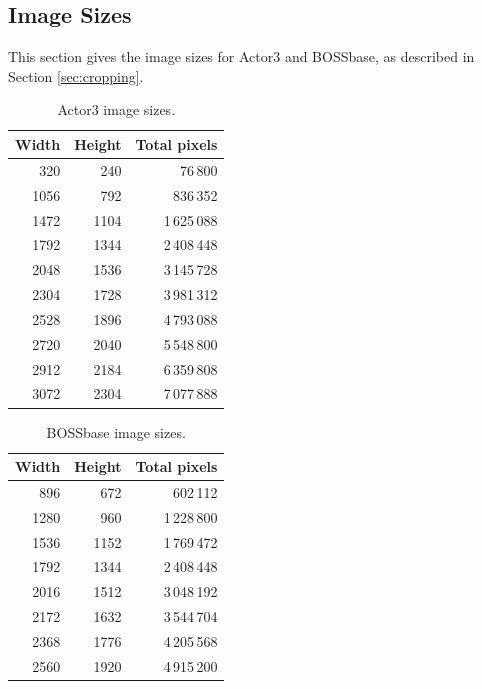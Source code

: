 \documentclass[11pt,a4paper,twoside,openright]{report}
\begin{document}
\begin{appendices}

\chapter{}

\section{Image Sizes} \label{appendix:image-sizes}

This section gives the image sizes for Actor3 and BOSSbase, as described in Section \ref{sec:cropping}.

\begin{table}[htbp]
    \begin{center}
        \begin{tabular}{ | r  r | r | }
        \hline
        Width & Height & Total pixels \\ \hline
        320 & 240 & 76\,800 \\
        1056 & 792 & 836\,352 \\
        1472 & 1104 & 1\,625\,088 \\
        1792 & 1344 & 2\,408\,448 \\
        2048 & 1536 & 3\,145\,728 \\
        2304 & 1728 & 3\,981\,312 \\
        2528 & 1896 & 4\,793\,088 \\
        2720 & 2040 & 5\,548\,800 \\
        2912 & 2184 & 6\,359\,808 \\
        3072 & 2304 & 7\,077\,888 \\ \hline
        \end{tabular}
        \caption{Actor3 image sizes.}
        \label{table:actor3-sizes}
    \end{center}
\end{table}

\begin{table}[htbp]
    \begin{center}
        \begin{tabular}{ | r  r | r | }
        \hline
        Width & Height & Total pixels \\ \hline
        896 & 672 & 602\,112 \\
        1280 & 960 & 1\,228\,800 \\
        1536 & 1152 & 1\,769\,472 \\
        1792 & 1344 & 2\,408\,448 \\
        2016 & 1512 & 3\,048\,192 \\
        2172 & 1632 & 3\,544\,704 \\
        2368 & 1776 & 4\,205\,568 \\
        2560 & 1920 & 4\,915\,200 \\ \hline
        \end{tabular}
        \caption{BOSSbase image sizes.}
        \label{table:bossbase-sizes}
    \end{center}
\end{table}



\end{appendices}
\end{document}
